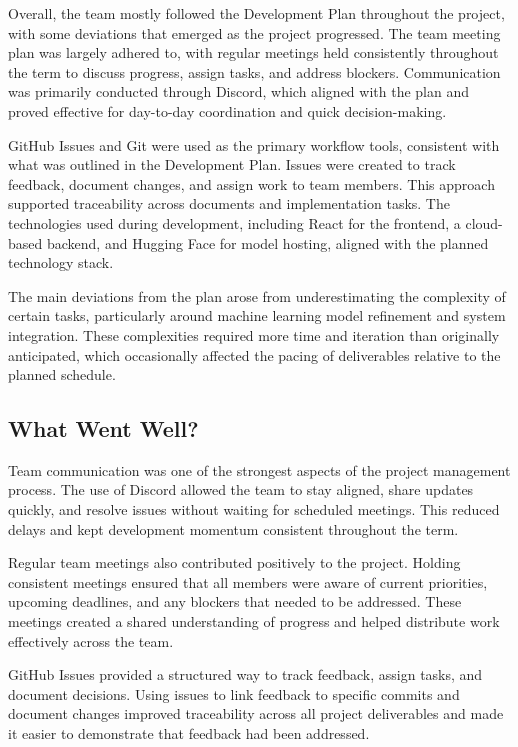 \documentclass{article}
\begin{document}
Overall, the team mostly followed the Development Plan throughout the project, with 
some deviations that emerged as the project progressed. The team meeting plan was 
largely adhered to, with regular meetings held consistently throughout the term to 
discuss progress, assign tasks, and address blockers. Communication was primarily 
conducted through Discord, which aligned with the plan and proved effective for 
day-to-day coordination and quick decision-making.

GitHub Issues and Git were used as the primary workflow tools, consistent with what 
was outlined in the Development Plan. Issues were created to track feedback, 
document changes, and assign work to team members. This approach supported 
traceability across documents and implementation tasks. The technologies used during 
development, including React for the frontend, a cloud-based backend, and Hugging 
Face for model hosting, aligned with the planned technology stack.

The main deviations from the plan arose from underestimating the complexity of 
certain tasks, particularly around machine learning model refinement and system 
integration. These complexities required more time and iteration than originally 
anticipated, which occasionally affected the pacing of deliverables relative to the 
planned schedule.

\subsection{What Went Well?}

Team communication was one of the strongest aspects of the project management 
process. The use of Discord allowed the team to stay aligned, share updates quickly, 
and resolve issues without waiting for scheduled meetings. This reduced delays and 
kept development momentum consistent throughout the term.

Regular team meetings also contributed positively to the project. Holding consistent 
meetings ensured that all members were aware of current priorities, upcoming 
deadlines, and any blockers that needed to be addressed. These meetings created a 
shared understanding of progress and helped distribute work effectively across the 
team.

GitHub Issues provided a structured way to track feedback, assign tasks, and 
document decisions. Using issues to link feedback to specific commits and document 
changes improved traceability across all project deliverables and made it easier to 
demonstrate that feedback had been addressed.
\end{document}
